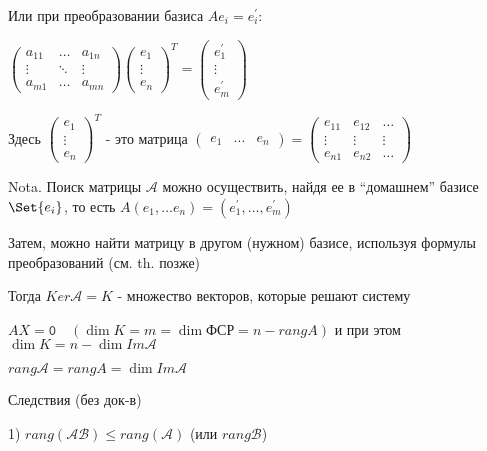 \documentclass[12pt]{article}
\begin{document}
    Или при преобразовании базиса $Ae_i = e^\prime_i$:

    $\begin{pmatrix}
         a_{11} & \dots & a_{1n} \\
         \vdots & \ddots & \vdots \\
         a_{m1} & \dots & a_{mn}
    \end{pmatrix} \begin{pmatrix}
         e_1 \\
         \vdots \\
         e_n
    \end{pmatrix}^T = \begin{pmatrix}
         e_1^\prime \\
         \vdots \\
         e_m^\prime
    \end{pmatrix}$

    Здесь $\begin{pmatrix}
         e_1 \\
         \vdots \\
         e_n
    \end{pmatrix}^T$ - это матрица $\begin{pmatrix}
         e_1 & \dots & e_n
    \end{pmatrix} = \begin{pmatrix}
         e_{11} & e_{12} & \dots \\
         \vdots & \vdots & \vdots \\
         e_{n1} & e_{n2} & \dots
    \end{pmatrix}$

    Nota. Поиск матрицы $\mathcal{A}$ можно осуществить, найдя ее в \enquote{домашнем} базисе $\Set{e_i}$, то есть $A (e_1, \dots e_n) = (e_1^\prime, \dots, e_m^\prime)$

    Затем, можно найти матрицу в другом (нужном) базисе, используя формулы преобразований (см. th. позже)

    Тогда $Ker \mathcal{A} = K$ - множество векторов, которые решают систему

    $AX = \texttt{0} \quad (\dim K = m = \dim \text{ФСР} = n - rang A)$ и при этом $\dim K = n - \dim Im \mathcal{A}$

    $rang \mathcal{A} = rang A = \dim Im \mathcal{A}$

    Следствия (без док-в)

    1) $rang(\mathcal{AB}) \leq rang(\mathcal{A})$ (или $rang \mathcal{B}$)
\end{document}
